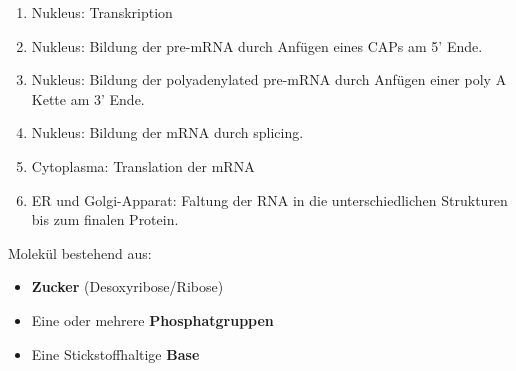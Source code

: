 
\begin{mechanism}[title=Beschreiben Sie die Umsetzung der genetischen Information in Eukaryoten unter Benennung der relevanten Zwischenstufen.]
\begin{enumerate}
    \item Nukleus: Transkription
    \item Nukleus: Bildung der pre-mRNA durch Anfügen eines CAPs am 5' Ende.
    \item Nukleus: Bildung der polyadenylated
pre-mRNA durch Anfügen einer poly A Kette am 3' Ende.
    \item Nukleus: Bildung der mRNA durch splicing.
    \item Cytoplasma: Translation der mRNA
    \item ER und Golgi-Apparat: Faltung der RNA in die unterschiedlichen Strukturen bis zum finalen Protein.
\end{enumerate}
\end{mechanism}
\begin{mechanism}[title=Definition Nukleotid]
Molekül bestehend aus: 
\begin{itemize}
    \item \textbf{Zucker} (Desoxyribose/Ribose)
    \item Eine oder mehrere \textbf{Phosphatgruppen}
    \item Eine Stickstoffhaltige \textbf{Base}
\end{itemize}
\end{mechanism}
\begin{mechanism}[title=]

\end{mechanism}
\begin{mechanism}[title=]

\end{mechanism}
